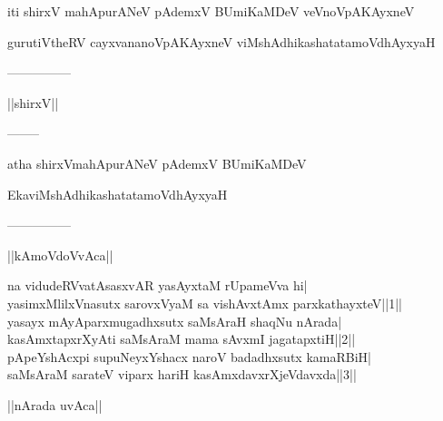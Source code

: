 \documentclass{article}
\begin{document}
\begin{center}
iti shirxV mahApurANeV pAdemxV BUmiKaMDeV veVnoVpAKAyxneV
\end{center}

\begin{center}
gurutiVtheRV cayxvananoVpAKAyxneV viMshAdhikashatatamoVdhAyxyaH
\end{center}

\begin{center}
---------------
\end{center}

\begin{center}
||shirxV||
\end{center}

\begin{center}
--------
\end{center}

\begin{center}
atha shirxVmahApurANeV pAdemxV BUmiKaMDeV
\end{center}

\begin{center}
EkaviMshAdhikashatatamoVdhAyxyaH
\end{center}

\begin{center}
---------------
\end{center}

\begin{center}
||kAmoVdoVvAca||
\end{center}

na vidudeRVvatAsasxvAR yasAyxtaM rUpameVva hi|\\
yasimxMlilxVnasutx sarovxVyaM sa vishAvxtAmx parxkathayxteV||1||\\
yasayx mAyAparxmugadhxsutx saMsAraH shaqNu nArada|\\
kasAmxtapxrXyAti saMsAraM mama sAvxmI jagatapxtiH||2||\\
pApeYshAcxpi supuNeyxYshacx naroV badadhxsutx kamaRBiH|\\
saMsAraM sarateV viparx hariH kasAmxdavxrXjeVdavxda||3||\\

\begin{center}
||nArada uvAca||
\end{center}
\end{document}
